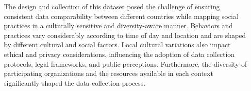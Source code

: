 
The design and collection of this dataset posed the challenge of ensuring consistent data comparability between different countries while mapping social practices in a culturally sensitive and diversity-aware manner. Behaviors and practices vary considerably according to time of day and location and are shaped by different cultural and social factors. Local cultural variations also impact ethical and privacy considerations, influencing the adoption of data collection protocols, legal frameworks, and public perceptions. Furthermore, the diversity of participating organizations and the resources available in each context significantly shaped the data collection process.

